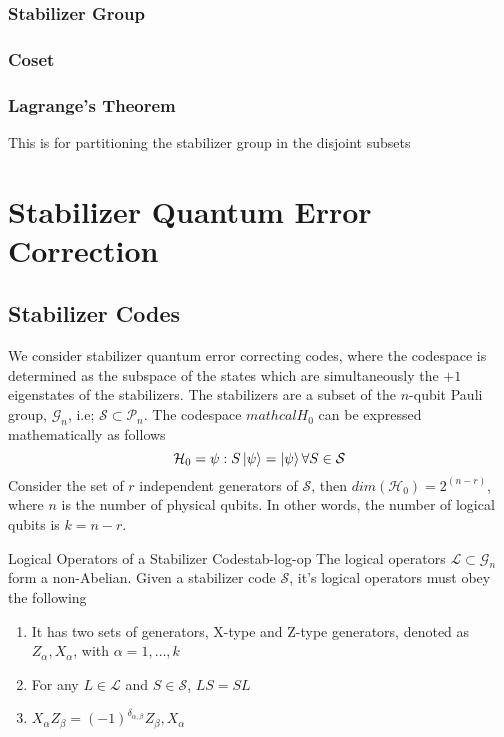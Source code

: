 \subsubsection{Stabilizer Group}

\subsubsection{Coset}

\subsubsection{Lagrange's Theorem}
This is for partitioning the stabilizer group in the disjoint subsets


\section{Stabilizer Quantum Error Correction}
\subsection{Stabilizer Codes}
We consider stabilizer quantum error correcting codes, where the codespace is determined as the subspace of the states which are simultaneously the \(+1\) eigenstates of the stabilizers. The stabilizers are a subset of the \(n\)-qubit Pauli group, \(\mathcal{G}_n\), i.e; \(\mathcal{S} \subset \mathcal{P}_n\). The codespace \(mathcal{H}_0\) can be expressed mathematically as follows
\begin{equation}\label{eqn: codespace}
    \mathcal{H}_0  = {\psi : S \ket{\psi} = \ket{\psi} \forall S \in \mathcal{S}}
\end{equation}
Consider the set of \(r\) independent generators of \(\mathcal{S}\), then \(dim(\mathcal{H}_0) = 2^(n-r)\), where \(n\) is the number of physical qubits. In other words, the number of logical qubits is \(k = n-r\).


\begin{boxed-defn}{Logical Operators of a Stabilizer Code}{stab-log-op}
The logical operators \(\mathcal{L} \subset \mathcal{G}_n\) form a non-Abelian. Given a stabilizer code \(\mathcal{S}\), it's logical operators must obey the following
\begin{enumerate}
    \item It has two sets of generators, X-type and Z-type generators, denoted as \(Z_\alpha, X_\alpha\), with \(\alpha = 1, \dots, k\)
    \item For any \(L \in \mathcal{L}\) and \(S \in \mathcal{S}\), \(LS = SL\)
    \item \(X_\alpha Z_\beta = (-1)^{\delta_{\alpha, \beta}} Z_\beta, X_\alpha\)
\end{enumerate}
\end{boxed-defn}

